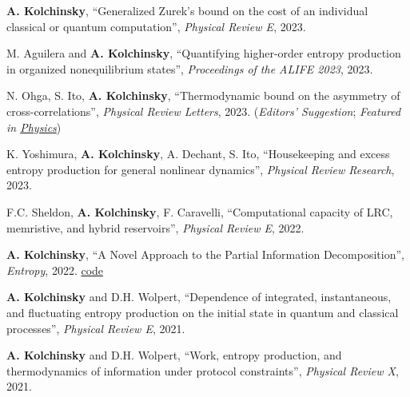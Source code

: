 \textbf{A. Kolchinsky}, ``Generalized Zurek's bound on the cost of an individual classical or quantum computation'', \emph{Physical Review E}, 2023.  

M. Aguilera and \textbf{A. Kolchinsky}, ``Quantifying higher-order entropy production in organized nonequilibrium states'', \emph{Proceedings of the ALIFE 2023}, 2023.  

N. Ohga, S. Ito, \textbf{A. Kolchinsky}, ``Thermodynamic bound on the asymmetry of cross-correlations'', \emph{Physical Review Letters}, 2023. (\emph{Editors' Suggestion}; \emph{Featured in \href{https://physics.aps.org/articles/v16/142}{Physics}})  

K. Yoshimura, \textbf{A. Kolchinsky}, A. Dechant, S. Ito, ``Housekeeping and excess entropy production for general nonlinear dynamics'', \emph{Physical Review Research}, 2023.  

F.C. Sheldon, \textbf{A. Kolchinsky}, F. Caravelli, ``Computational capacity of LRC, memristive, and hybrid reservoirs'', \emph{Physical Review E}, 2022.  

\textbf{A. Kolchinsky}, ``A Novel Approach to the Partial Information Decomposition'', \emph{Entropy}, 2022.  \href{https://github.com/artemyk/redundancy}{code} 

\textbf{A. Kolchinsky} and D.H. Wolpert, ``Dependence of integrated, instantaneous, and fluctuating entropy production on the initial state in quantum and classical processes'', \emph{Physical Review E}, 2021.  

\textbf{A. Kolchinsky} and D.H. Wolpert, ``Work, entropy production, and thermodynamics of information under protocol constraints'', \emph{Physical Review X}, 2021.  

